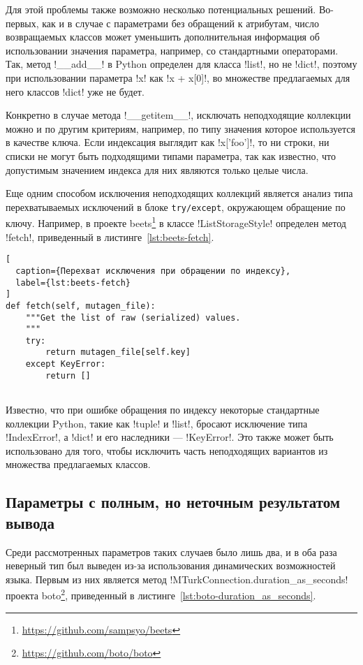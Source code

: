 Для этой проблемы также возможно несколько потенциальных решений. Во-первых, как
и в случае с параметрами без обращений к атрибутам, число возвращаемых классов
может уменьшить дополнительная информация об использовании значения параметра,
например, со стандартными операторами. Так, метод !__add__! в Python определен
для класса !list!, но не !dict!, поэтому при использовании параметра
!x! как !x + x[0]!, во множестве предлагаемых для него классов !dict! уже не будет.

Конкретно в случае метода !__getitem__!, исключать неподходящие коллекции можно
и по другим критериям, например, по типу значения которое используется в
качестве ключа. Если индексация выглядит как !x['foo']!, то ни строки, ни списки
не могут быть подходящими типами параметра, так как известно, что допустимым
значением индекса для них являются только целые числа. 

Еще одним способом исключения неподходящих коллекций является анализ типа
перехватываемых исключений в блоке \texttt{try/except}, окружающем обращение по
ключу. Например, в проекте
beets\footnote{\url{https://github.com/sampsyo/beets}} в классе
!ListStorageStyle! определен метод !fetch!, приведенный в
листинге~\ref{lst:beets-fetch}.

\begin{lstlisting}[
  caption={Перехват исключения при обращении по индексу},
  label={lst:beets-fetch}
]
def fetch(self, mutagen_file):
    """Get the list of raw (serialized) values.
    """
    try:
        return mutagen_file[self.key]
    except KeyError:
        return []
    
\end{lstlisting}

Известно, что при ошибке обращения по индексу некоторые стандартные коллекции
Python, такие как !tuple! и !list!, бросают исключение типа !IndexError!, а
!dict! и его наследники --- !KeyError!. Это также может быть использовано для
того, чтобы исключить часть неподходящих вариантов из множества предлагаемых
классов.

\subsection{Параметры с полным, но неточным результатом вывода}
\label{sub:unsound-complete}

Среди рассмотренных параметров таких случаев было лишь два, и в оба раза
неверный тип был выведен из-за использования динамических возможностей языка.
Первым из них является метод !MTurkConnection.duration_as_seconds! проекта 
boto\footnote{\url{https://github.com/boto/boto}},
приведенный в листинге~\ref{lst:boto-duration_as_seconds}.

